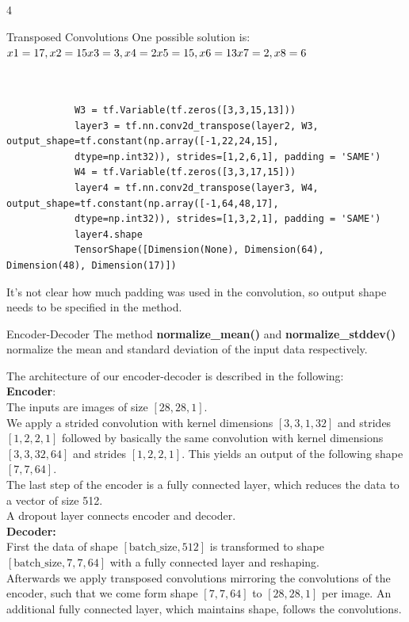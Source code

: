 \documentclass{article}
\begin{document}
    \begin{ukon-infie}[28.1.18]{4}

		
		\begin{exercise}[p=20]{Transposed Convolutions}
		\question{}
		{
			One possible solution is:\\
			$x1=17, x2=15\\ x3=3, x4=2\\ x5=15, x6=13\\ x7=2, x8=6$
		}
		\question{}{}
		\begin{verbatim}
		
		
			W3 = tf.Variable(tf.zeros([3,3,15,13]))
			layer3 = tf.nn.conv2d_transpose(layer2, W3, output_shape=tf.constant(np.array([-1,22,24,15],
			dtype=np.int32)), strides=[1,2,6,1], padding = 'SAME')
			W4 = tf.Variable(tf.zeros([3,3,17,15]))
			layer4 = tf.nn.conv2d_transpose(layer3, W4, output_shape=tf.constant(np.array([-1,64,48,17],
			dtype=np.int32)), strides=[1,3,2,1], padding = 'SAME')
			layer4.shape
			TensorShape([Dimension(None), Dimension(64), Dimension(48), Dimension(17)])
		\end{verbatim}	
		
		\question{}
		{
			It's not clear how much padding was used in the convolution, so output shape needs to be specified in the method.
		}
		\end{exercise}
		
		\begin{exercise}[p=60]{Encoder-Decoder}
		\question{}
		{
		The method \textbf{normalize\_mean()} and \textbf{normalize\_stddev()} normalize the mean and standard deviation of the input data respectively.
		}
		\question{}
		{		
		The architecture of our encoder-decoder is described in the following:\\
		\textbf{Encoder}:\\
		The inputs are images of size $[28 , 28 , 1]$.\\
		We apply a strided convolution with kernel dimensions $[3,3,1,32]$ and strides $[1,2,2,1]$ followed by basically the same convolution with kernel dimensions $[3,3,32,64]$ and strides $[1,2,2,1]$. This yields an output of the following shape $[7,7,64]$.\\
		The last step of the encoder is a fully connected layer, which reduces the data to a vector of size 512.\\
		A dropout layer connects encoder and decoder.\\
		
		\textbf{Decoder:}\\
		First the data of shape $[\text{batch\_size},512 ]$ is transformed to shape $[\text{batch\_size},7,7,64 ]$ with a fully connected layer and reshaping.\\
		Afterwards we apply transposed convolutions mirroring the convolutions of the encoder, such that we come form shape $[7,7,64]$ to $[28,28,1]$ per image. An additional fully connected layer, which maintains shape, follows the convolutions.
		
}
\end{exercise}
\end{ukon-infie}
\end{document}

